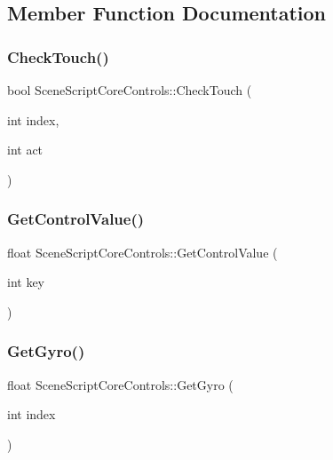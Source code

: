 \subsection{Member Function Documentation}
\hypertarget{class_scene_script_core_controls_a0ce07a8a3e36a6343710622becb41f35}{}\label{class_scene_script_core_controls_a0ce07a8a3e36a6343710622becb41f35} 
\subsubsection{\texorpdfstring{Check\+Touch()}{CheckTouch()}}
{\footnotesize\ttfamily bool Scene\+Script\+Core\+Controls\+::\+Check\+Touch (\begin{DoxyParamCaption}\item[{int}]{index,  }\item[{int}]{act }\end{DoxyParamCaption})}

\hypertarget{class_scene_script_core_controls_abb51e470e55c08401fa72e1777f2a9d1}{}\label{class_scene_script_core_controls_abb51e470e55c08401fa72e1777f2a9d1} 
\subsubsection{\texorpdfstring{Get\+Control\+Value()}{GetControlValue()}}
{\footnotesize\ttfamily float Scene\+Script\+Core\+Controls\+::\+Get\+Control\+Value (\begin{DoxyParamCaption}\item[{int}]{key }\end{DoxyParamCaption})}

\hypertarget{class_scene_script_core_controls_a228ce5332a73c9203f97bc95c4bb8645}{}\label{class_scene_script_core_controls_a228ce5332a73c9203f97bc95c4bb8645} 
\subsubsection{\texorpdfstring{Get\+Gyro()}{GetGyro()}}
{\footnotesize\ttfamily float Scene\+Script\+Core\+Controls\+::\+Get\+Gyro (\begin{DoxyParamCaption}\item[{int}]{index }\end{DoxyParamCaption})}

